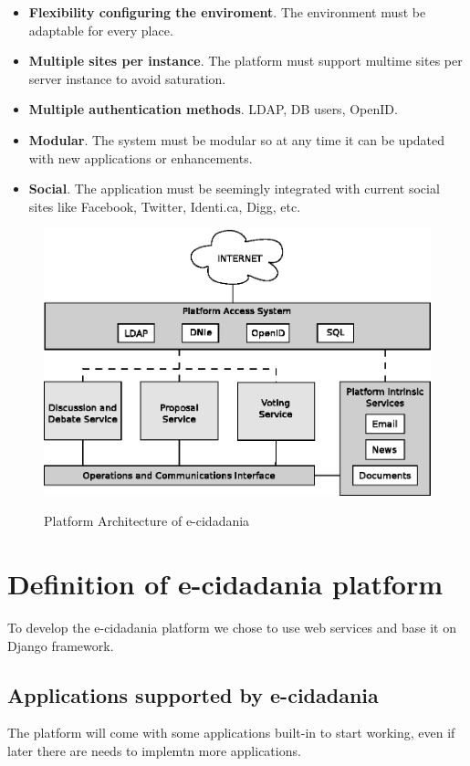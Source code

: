 \documentclass[12pt,a4paper]{article}
\begin{document}
\begin{itemize}
\item {\bf Flexibility configuring the enviroment}. The environment must be adaptable for every place.
\item {\bf Multiple sites per instance}. The platform must support multime sites per server instance to avoid saturation.
\item {\bf Multiple authentication methods}. LDAP, DB users, OpenID.
\item {\bf Modular}. The system must be modular so at any time it can be updated with new applications or enhancements.
\item {\bf Social}. The application must be seemingly integrated with current social sites like Facebook, Twitter, Identi.ca, Digg, etc.
\end{itemize}

\newpage

\begin{figure}
	\centering
		\includegraphics[scale=1]{images/architecture.eps}\\
	\caption{Platform Architecture of e-cidadania}

\end{figure}

\section{Definition of e-cidadania platform}
To develop the e-cidadania platform we chose to use web services and base it on Django framework.

\subsection{Applications supported by e-cidadania}
The platform will come with some applications built-in to start working, even if later there are needs to implemtn more applications.
\end{document}
